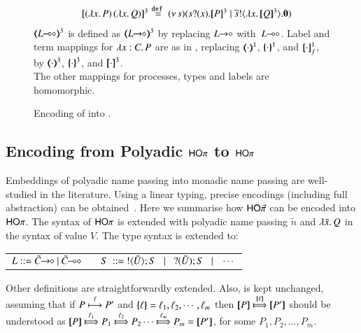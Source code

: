 \begin{figure}[t]
\[{\begin{array}{lrcll}
&  \pmap{\appl{(\abs{x}{P})}{(\abs{x}Q})}{3} &\!\!\!\!\defeq\!\!\!\!& \newsp{s}{\binp{s}{x} \pmap{P}{3} \Par  \bout{\dual{s}}{\abs{x} \pmap{Q}{3}} \inact}
	\end{array}
	}
	\]
	{\small $\tmap{\lhot{L}}{3}$ is defined as
	$\tmap{\shot{L}}{3}$
	by replacing $L\!\! \rightarrow\!\! \diamond$ with~$L\!\! \multimap\!\! \diamond$. 
	Label and term mappings for $\lambda x:C.\,P$  
are %
as in , replacing 
$(\!\!\langle\cdot\rangle\!\!)^{1}$,
$\{\!\!\{\cdot\}\!\!\}^{1}$, and 
$[\!\![\cdot]\!\!]^1_f$, by  
$(\!\!\langle\cdot\rangle\!\!)^{3}$,
$\{\!\!\{\cdot\}\!\!\}^{3}$, and 
$[\!\![\cdot]\!\!]^3$. \\
The other mappings for processes, types and labels are  homomorphic.} \\
\caption{\label{f:enc:hopip_to_hopi} 
Encoding of \HOpp into \HOp.
}
\Hlinefig
\end{figure} 

\subsection{Encoding from Polyadic $\mathsf{HO}\pi$ to $\mathsf{HO}\pi$}
\label{subsec:pho}
\noi Embeddings of polyadic name passing into monadic name passing are
well-studied in the literature. Using a linear typing, precise
encodings (including full abstraction) can be obtained~\cite{Yoshida96}.
Here we summarise how $\mathsf{HO}{\vec{\pi}}$ can be encoded into $\mathsf{HO}\pi$. 
The syntax of 
$\mathsf{HO}\pi$ is extended %
with
polyadic name passing $\tilde{n}$ and $\lambda \tilde{x}.\,Q$ in the syntax 
of value $V$. The type syntax is extended to: 
%
\begin{center}
\begin{tabular}{c}
$
L ::= \shot{\tilde{C}} \ | \ \lhot{\tilde{C}}
\quad\quad S \ ::= \  \btout{\tilde{U}} S \bnfbar \btinp{\tilde{U}} S \bnfbar \cdots 
$
\end{tabular}
\end{center}
%
Other definitions are straightforwardly extended. 
Also,  is kept unchanged, 
assuming that if 
$P \stackrel{\ell}{\longmapsto} P'$ and $\{\!\!\{\ell\}\!\!\} = \ell_1, \ell_2,  \cdots, \ell_m$ then
$\map{P} \Hby{\mapa{\ell}} \map{P'}$
should be understood as
$\map{P} \Hby{\ell_1} P_1 \Hby{\ell_2} P_2 \cdots \Hby{\ell_m} P_m =  \map{P'}$,
for some
$P_1, P_2, \ldots, P_m$.

